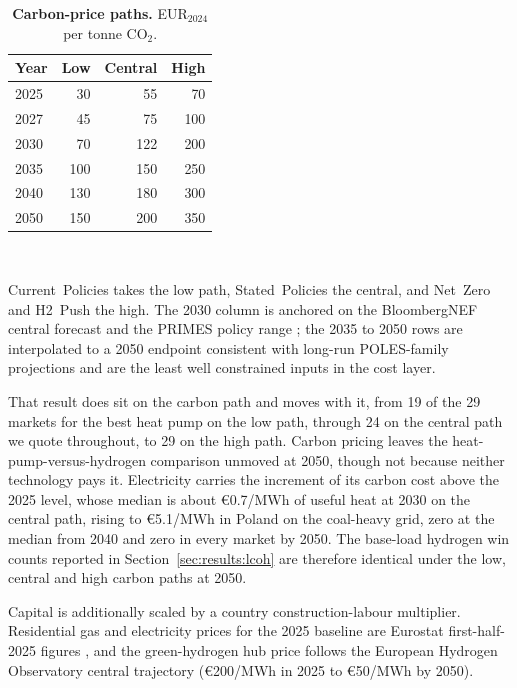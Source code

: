 \begin{table}[htbp]
 \centering
 \caption{\textbf{Carbon-price paths.} EUR$_{2024}$ per tonne CO$_2$.}
 \label{tab:si_carbonpath}
 \begin{tabular}{lrrr}
 \toprule
 Year & Low & Central & High \\
 \midrule
 2025 & 30 & 55 & 70 \\
 2027 & 45 & 75 & 100 \\
 2030 & 70 & 122 & 200 \\
 2035 & 100 & 150 & 250 \\
 2040 & 130 & 180 & 300 \\
 2050 & 150 & 200 & 350 \\
 \bottomrule
 \end{tabular}
 \\[3pt]{\footnotesize\raggedright
 Current~Policies takes the low path, Stated~Policies the central, and Net~Zero and
 H2~Push the high. The 2030 column is anchored on the BloombergNEF central forecast and
 the PRIMES policy range \citep{BNEF2025ETS2,Gunther2025ets2}; the 2035 to 2050 rows are
 interpolated to a 2050 endpoint consistent with long-run POLES-family projections and
 are the least well constrained inputs in the cost layer.\par}
\end{table}

That result does sit on the carbon path and moves with it, from 19 of the 29 markets
for the best heat pump on the low path, through 24 on the central path we quote
throughout, to 29 on the high path. Carbon pricing leaves the heat-pump-versus-hydrogen comparison unmoved at 2050, though
not because neither technology pays it. Electricity carries the increment of its carbon
cost above the 2025 level, whose median is about \euro{}0.7/MWh of useful heat at 2030 on
the central path, rising to \euro{}5.1/MWh in Poland on the coal-heavy grid, zero at the
median from 2040 and zero in every market by 2050. The base-load hydrogen win counts reported in
Section~\ref{sec:results:lcoh} are therefore identical under the low, central and high
carbon paths at 2050.

Capital is additionally scaled by a country construction-labour multiplier. Residential gas and
electricity prices for the 2025 baseline are Eurostat first-half-2025 figures
\citep{Eurostat2025electricityprices,Eurostat2025gasprices}, and the green-hydrogen hub
price follows the European Hydrogen Observatory central trajectory
\citep{EHO2024hydrogencosts,EHO2024lcohcalculator} (\euro{}200/MWh in 2025 to \euro{}50/MWh by 2050).

